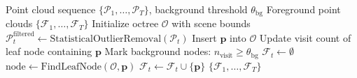 

\begin{algorithm}[H]
\caption{SVO-Based Incremental Background Removal}
\label{alg:background_removal}
\begin{algorithmic}[1]
\REQUIRE Point cloud sequence $\{\mathcal{P}_1, \ldots, \mathcal{P}_T\}$, background threshold $\theta_{\text{bg}}$
\ENSURE Foreground point clouds $\{\mathcal{F}_1, \ldots, \mathcal{F}_T\}$
\STATE Initialize octree $\mathcal{O}$ with scene bounds
    \STATE $\mathcal{P}_t^{\text{filtered}} \leftarrow \text{StatisticalOutlierRemoval}(\mathcal{P}_t)$
        \STATE Insert $\mathbf{p}$ into $\mathcal{O}$
        \STATE Update visit count of leaf node containing $\mathbf{p}$
    \ENDFOR
        \STATE Mark background nodes: $n_{\text{visit}} \geq \theta_{\text{bg}}$
    \ENDIF
    \STATE $\mathcal{F}_t \leftarrow \emptyset$
        \STATE $\text{node} \leftarrow \text{FindLeafNode}(\mathcal{O}, \mathbf{p})$
            \STATE $\mathcal{F}_t \leftarrow \mathcal{F}_t \cup \{\mathbf{p}\}$
        \ENDIF
    \ENDFOR
\ENDFOR
\RETURN $\{\mathcal{F}_1, \ldots, \mathcal{F}_T\}$
\end{algorithmic}
\end{algorithm}


